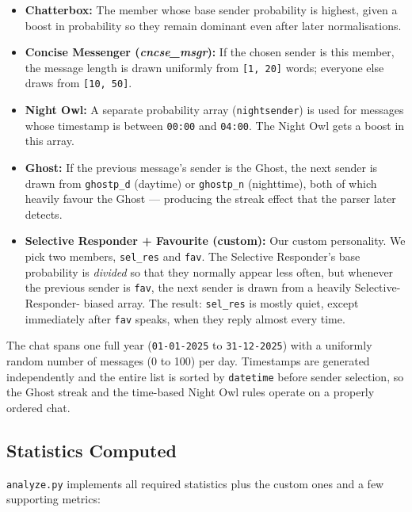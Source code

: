\documentclass[12pt]{article}
\begin{document}
\begin{itemize}
    \item \textbf{Chatterbox:} The member whose base sender probability is
    highest, given a boost in probability so they remain dominant even
    after later normalisations.

    \item \textbf{Concise Messenger (\textit{cncse\_msgr}):} If the chosen
    sender is this member, the message length is drawn uniformly from
    \texttt{[1, 20]} words; everyone else draws from \texttt{[10, 50]}.

    \item \textbf{Night Owl:} A separate probability array
    (\texttt{nightsender}) is used for messages whose timestamp is between
    \texttt{00:00} and \texttt{04:00}. The Night Owl gets a
    boost in this array.

    \item \textbf{Ghost:} If the previous message's sender is the Ghost, the
    next sender is drawn from \texttt{ghostp\_d} (daytime) or \texttt{ghostp\_n}
    (nighttime), both of which heavily favour the Ghost --- producing the
    streak effect that the parser later detects.

    \item \textbf{Selective Responder + Favourite (custom):} Our custom
    personality. We pick two members, \texttt{sel\_res} and \texttt{fav}.
    The Selective Responder's base probability is \emph{divided} so that they
    normally appear less often, but whenever the previous sender is
    \texttt{fav}, the next sender is drawn from a heavily Selective-Responder-
    biased array. The result: \texttt{sel\_res} is mostly quiet, except
    immediately after \texttt{fav} speaks, when they reply almost every time.
\end{itemize}

The chat spans one full year (\texttt{01-01-2025} to \texttt{31-12-2025}) with a uniformly random number of messages
(0 to 100) per day. Timestamps are generated independently and the entire
list is sorted by \texttt{datetime} before sender selection, so the Ghost
streak and the time-based Night Owl rules operate on a properly ordered chat.

\subsection{Statistics Computed}

\texttt{analyze.py} implements all required statistics plus the custom
ones and a few supporting metrics:
\end{document}
